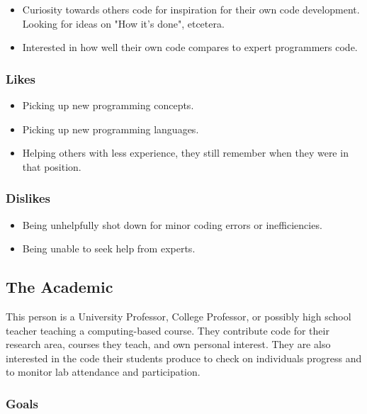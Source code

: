 \documentclass[11pt,a4paper]{article}
\begin{document}
\begin{itemize}
\item Curiosity towards others code for inspiration for their own code
development. Looking for ideas on "How it's done", etcetera.
\item Interested in how well their own code compares to expert programmers
code.
\end{itemize}

\subsubsection{Likes}

\begin{itemize}
\item Picking up new programming concepts.
\item Picking up new programming languages.
\item Helping others with less experience, they still remember when they were
in that position.
\end{itemize}

\subsubsection{Dislikes}

\begin{itemize}
\item Being unhelpfully shot down for minor coding errors or inefficiencies.
\item Being unable to seek help from experts.
\end{itemize}

\newpage

\subsection{The Academic}

This person is a University Professor, College Professor, or possibly high
school teacher teaching a computing-based course. They contribute code for
their research area, courses they teach, and own personal interest. They are
also interested in the code their students produce to check on individuals
progress and to monitor lab attendance and participation.

\subsubsection{Goals}
\end{document}
